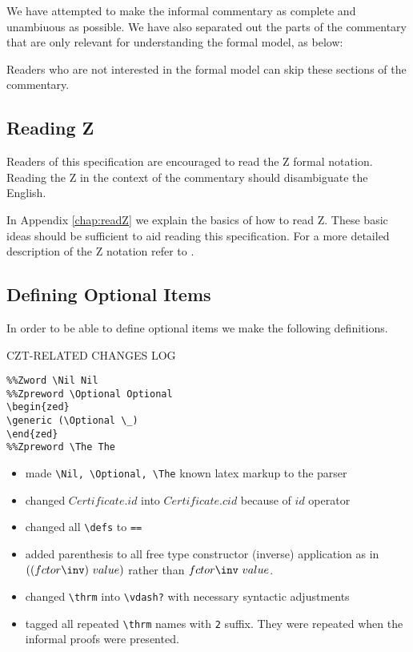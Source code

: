 We have attempted to make the informal commentary as complete and
unambiuous as possible. We have also separated out the parts of the
commentary that are only relevant for understanding the formal model,
as below:
\begin{Zcomment}
\item
Readers who are not interested in the formal model can skip these
sections of the commentary.
\end{Zcomment}

\subsection{Reading Z}
Readers of this specification are encouraged to read the Z formal notation. 
Reading the Z in the context of the commentary should disambiguate the
English. 

In Appendix \ref{chap:readZ} we explain the basics of how to read Z. 
These basic ideas should be sufficient to aid reading this
specification. For a more detailed description of the Z notation refer
to \cite{Spivey}.

\subsection{Defining Optional Items}

In order to be able to define optional items we make the following definitions.

\def\Nil{nil}%
\def\Optional{\mathop{\rm optional}}
\def\The{the~}%


CZT-RELATED CHANGES LOG 

\begin{verbatim}
%%Zword \Nil Nil
%%Zpreword \Optional Optional
\begin{zed}
\generic (\Optional \_)
\end{zed}
%%Zpreword \The The
\end{verbatim}

\begin{itemize}
   \item made \verb'\Nil, \Optional, \The' known latex markup to the parser
   \item changed $Certificate.id$ into $Certificate.cid$ because of $id$ operator
   \item changed all \verb'\defs' to \verb'=='
   \item added parenthesis to all free type constructor (inverse) application as
   	 in  $((fctor\inv)~value)$ rather than $fctor\inv~ value$.
   \item changed \verb'\thrm' into \verb'\vdash?' with necessary syntactic adjustments
   \item tagged all repeated \verb'\thrm' names with \verb'2' suffix. They were
   	 repeated when the informal proofs were presented.
\end{itemize}

